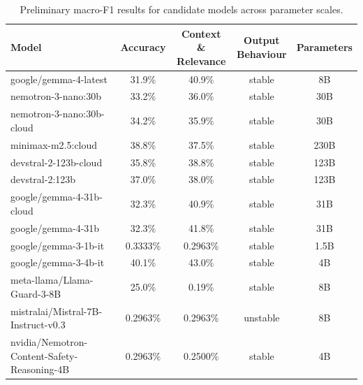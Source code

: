 \documentclass[11pt,a4paper]{article}
\begin{document}
\begin{table}[h]
\centering
\small
\begin{tabularx}{\textwidth}{@{}>{\raggedright\arraybackslash}Xcccc@{}}
\toprule
Model & Accuracy & \shortstack{Context \\ \& Relevance} & \shortstack{Output \\ Behaviour} & Parameters \\
\midrule
google/\allowbreak{}gemma-\allowbreak{}4-\allowbreak{}latest & 31.9\% & 40.9\% & stable & 8B \\


nemotron-3-nano:30b & 33.2\% & 36.0\% & stable & 30B \\
nemotron-3-nano:30b-cloud & 34.2\% & 35.9\% & stable & 30B\\

minimax-m2.5:cloud & 38.8\% & 37.5\% & stable & 230B\\
devstral-2-123b-cloud & 35.8\% & 38.8\% & stable & 123B\\
devstral-2:123b & 37.0\% & 38.0\% & stable & 123B \\
 
google/\allowbreak{}gemma-\allowbreak{}4-\allowbreak{}31b-\allowbreak{}cloud & 32.3\% & 40.9\% & stable & 31B \\
google/\allowbreak{}gemma-\allowbreak{}4-\allowbreak{}31b & 32.3\% & 41.8\% & stable & 31B \\
google/\allowbreak{}gemma-\allowbreak{}3-\allowbreak{}1b-\allowbreak{}it & 0.3333\% & 0.2963\% & stable & 1.5B \\
google/\allowbreak{}gemma-\allowbreak{}3-\allowbreak{}4b-\allowbreak{}it & 40.1\% & 43.0\% & stable & 4B \\
meta-\allowbreak{}llama/\allowbreak{}Llama-\allowbreak{}Guard-\allowbreak{}3-\allowbreak{}8B & 25.0\% & 0.19\% & stable & 8B \\
mistralai/\allowbreak{}Mistral-\allowbreak{}7B-\allowbreak{}Instruct-\allowbreak{}v0.3 & 0.2963\% & 0.2963\% & unstable & 8B \\
 nvidia/\allowbreak{}Nemotron-\allowbreak{}Content-\allowbreak{}Safety-\allowbreak{}Reasoning-\allowbreak{}4B & 0.2963\% & 0.2500\% & stable & 4B \\
\bottomrule
\end{tabularx}
\caption{Preliminary macro-F1 results for candidate models across parameter scales.}
\label{tab:initial}
\end{table}
\end{document}
